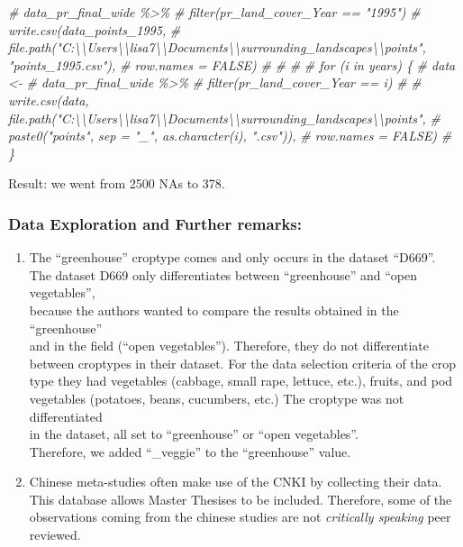 \documentclass[
]{article}
\newenvironment{Shaded}{\begin{snugshade}}{\end{snugshade}}
\newcommand{\CommentTok}[1]{\textcolor[rgb]{0.56,0.35,0.01}{\textit{#1}}}
\providecommand{\tightlist}{%
  \setlength{\itemsep}{0pt}\setlength{\parskip}{0pt}}
\begin{document}
\begin{Shaded}
\begin{Highlighting}[]
\CommentTok{\# data\_pr\_final\_wide \%\textgreater{}\% }
\CommentTok{\#   filter(pr\_land\_cover\_Year == "1995")}
\CommentTok{\# write.csv(data\_points\_1995, }
\CommentTok{\#           file.path("C:\textbackslash{}\textbackslash{}Users\textbackslash{}\textbackslash{}lisa7\textbackslash{}\textbackslash{}Documents\textbackslash{}\textbackslash{}surrounding\_landscapes\textbackslash{}\textbackslash{}points", "points\_1995.csv"), }
\CommentTok{\#           row.names = FALSE)}
\CommentTok{\# }
\CommentTok{\# }
\CommentTok{\# }
\CommentTok{\# for (i in years) \{}
\CommentTok{\# data \textless{}{-} }
\CommentTok{\# data\_pr\_final\_wide \%\textgreater{}\% }
\CommentTok{\#   filter(pr\_land\_cover\_Year == i)}
\CommentTok{\# }
\CommentTok{\# write.csv(data, file.path("C:\textbackslash{}\textbackslash{}Users\textbackslash{}\textbackslash{}lisa7\textbackslash{}\textbackslash{}Documents\textbackslash{}\textbackslash{}surrounding\_landscapes\textbackslash{}\textbackslash{}points",}
\CommentTok{\#                           paste0("points", sep = "\_", as.character(i), ".csv")), }
\CommentTok{\#                           row.names = FALSE)}
\CommentTok{\# \}}
\end{Highlighting}
\end{Shaded}

Result: we went from 2500 NAs to 378.

\subsubsection{Data Exploration and Further
remarks:}\label{data-exploration-and-further-remarks}

\begin{enumerate}
\def\labelenumi{\arabic{enumi}.}
\tightlist
\item
  The ``greenhouse'' croptype comes and only occurs in the dataset
  ``D669''.\\
  The dataset D669 only differentiates between ``greenhouse'' and ``open
  vegetables'',\\
  because the authors wanted to compare the results obtained in the
  ``greenhouse''\\
  and in the field (``open vegetables''). Therefore, they do not
  differentiate\\
  between croptypes in their dataset. For the data selection criteria of
  the crop\\
  type they had vegetables (cabbage, small rape, lettuce, etc.), fruits,
  and pod\\
  vegetables (potatoes, beans, cucumbers, etc.) The croptype was not
  differentiated\\
  in the dataset, all set to ``greenhouse'' or ``open vegetables''.\\
  Therefore, we added ``\_veggie'' to the ``greenhouse'' value.\\
\item
  Chinese meta-studies often make use of the CNKI by collecting their
  data. This database allows Master Thesises to be included. Therefore,
  some of the observations coming from the chinese studies are not
  \emph{critically speaking} peer reviewed.
\end{enumerate}
\end{document}
